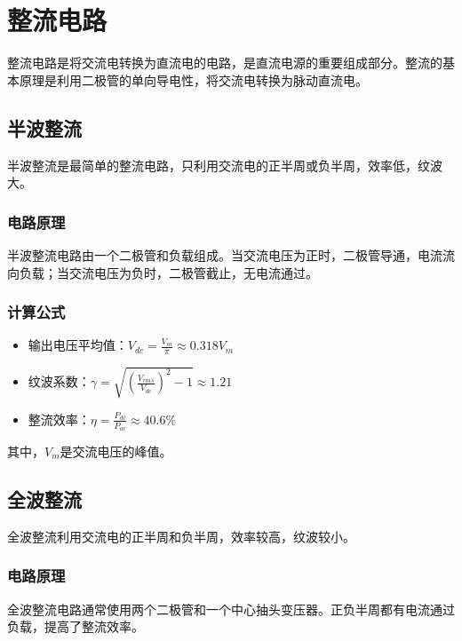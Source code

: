 \documentclass[12pt,UTF8]{ctexbook}
\begin{document}
\section{整流电路}

整流电路是将交流电转换为直流电的电路，是直流电源的重要组成部分。整流的基本原理是利用二极管的单向导电性，将交流电转换为脉动直流电。

\subsection{半波整流}

半波整流是最简单的整流电路，只利用交流电的正半周或负半周，效率低，纹波大。

\subsubsection{电路原理}

半波整流电路由一个二极管和负载组成。当交流电压为正时，二极管导通，电流流向负载；当交流电压为负时，二极管截止，无电流通过。

\subsubsection{计算公式}

\begin{itemize}
    \item 输出电压平均值：$V_{dc} = \frac{V_{m}}{\pi} \approx 0.318 V_{m}$
    \item 纹波系数：$\gamma = \sqrt{\left(\frac{V_{rms}}{V_{dc}}\right)^2 - 1} \approx 1.21$
    \item 整流效率：$\eta = \frac{P_{dc}}{P_{ac}} \approx 40.6\%$
\end{itemize}

其中，$V_{m}$是交流电压的峰值。

\subsection{全波整流}

全波整流利用交流电的正半周和负半周，效率较高，纹波较小。

\subsubsection{电路原理}

全波整流电路通常使用两个二极管和一个中心抽头变压器。正负半周都有电流通过负载，提高了整流效率。
\end{document}
